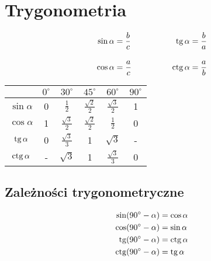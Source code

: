 \chapter{Trygonometria}

\begin{center}
\end{center}

\begin{equation}
  \begin{aligned}
    \sin \alpha &= \frac b c \qquad\qquad& \operatorname{tg} \alpha &= \frac b a\\[1em]
    \cos \alpha &= \frac a c \qquad\qquad& \operatorname{ctg}\alpha &= \frac a b
  \end{aligned}
\end{equation}
\vspace{20pt}
\begin{center}
  \begin{tabular}{|*6{c|}}
    \hline
    & $0^\circ$ & $30^\circ$ & $45^\circ$ & $60^\circ$ & $90^\circ$\\
    \hline
    $\sin \alpha$ & 0 & $\frac 1 2$ & $\frac{\sqrt 2}{2}$ & $\frac{\sqrt 3}{2}$ & 1\\
    \hline
    $\cos \alpha$ & 1 & $\frac{\sqrt 3}{2}$ & $\frac{\sqrt 2}{2}$ & $\frac 1 2$ & 0\\
    \hline
    $\operatorname{tg} \alpha$ & 0 & $\frac{\sqrt 3}{3}$ & 1 & $\sqrt 3$ & -\\
    \hline
    $\operatorname{ctg} \alpha$ & - & $\sqrt 3$ & 1 & $\frac{\sqrt 3}{3}$ & 0\\
    \hline
  \end{tabular}
\end{center}

\section{Zależności trygonometryczne}
\begin{equation}
  \begin{aligned}
    \sin(90^\circ - \alpha) &= \cos \alpha\\
    \cos(90^\circ - \alpha) &= \sin \alpha\\
    \operatorname{tg}(90^\circ - \alpha) &= \operatorname{ctg} \alpha\\
    \operatorname{ctg}(90^\circ - \alpha) &= \operatorname{tg} \alpha
  \end{aligned}
\end{equation}

